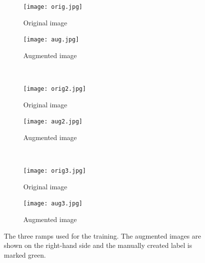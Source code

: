 \begin{figure}[htb]
	\centering
	\begin{subfigure}{.47\linewidth}
		\centering
		\texttt{[image: orig.jpg]}
		\caption{Original image}
	\end{subfigure}
	\begin{subfigure}{.47\linewidth}
		\centering
		\texttt{[image: aug.jpg]}
		\caption{Augmented image}
	\end{subfigure}
	\\
	\begin{subfigure}{.47\linewidth}
		\centering
		\texttt{[image: orig2.jpg]}
		\caption{Original image}
	\end{subfigure}
	\begin{subfigure}{.47\linewidth}
		\centering
		\texttt{[image: aug2.jpg]}
		\caption{Augmented image}
	\end{subfigure}
	\\
	\begin{subfigure}{.47\linewidth}
		\centering
		\texttt{[image: orig3.jpg]}
		\caption{Original image}
	\end{subfigure}
	\begin{subfigure}{.47\linewidth}
		\centering
		\texttt{[image: aug3.jpg]}
		\caption{Augmented image}
	\end{subfigure}
	\caption[Augmented images]{The three ramps used for the training. The augmented images are shown on the right-hand side and the manually created label is marked green.}
	\label{fig:img_augmentated}
\end{figure}


